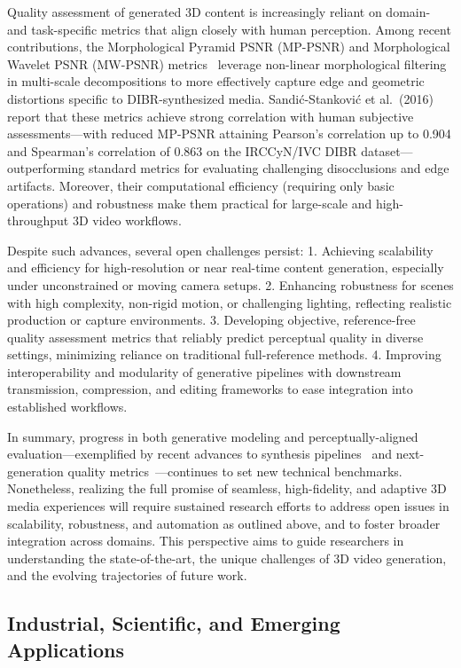 \documentclass[sigconf]{acmart}
\begin{document}
Quality assessment of generated 3D content is increasingly reliant on domain- and task-specific metrics that align closely with human perception. Among recent contributions, the Morphological Pyramid PSNR (MP-PSNR) and Morphological Wavelet PSNR (MW-PSNR) metrics~\cite{ref99} leverage non-linear morphological filtering in multi-scale decompositions to more effectively capture edge and geometric distortions specific to DIBR-synthesized media. Sandić-Stanković et al.~(2016)~\cite{ref99} report that these metrics achieve strong correlation with human subjective assessments---with reduced MP-PSNR attaining Pearson's correlation up to 0.904 and Spearman's correlation of 0.863 on the IRCCyN/IVC DIBR dataset---outperforming standard metrics for evaluating challenging disocclusions and edge artifacts. Moreover, their computational efficiency (requiring only basic operations) and robustness make them practical for large-scale and high-throughput 3D video workflows.

Despite such advances, several open challenges persist:
1. Achieving scalability and efficiency for high-resolution or near real-time content generation, especially under unconstrained or moving camera setups.
2. Enhancing robustness for scenes with high complexity, non-rigid motion, or challenging lighting, reflecting realistic production or capture environments.
3. Developing objective, reference-free quality assessment metrics that reliably predict perceptual quality in diverse settings, minimizing reliance on traditional full-reference methods.
4. Improving interoperability and modularity of generative pipelines with downstream transmission, compression, and editing frameworks to ease integration into established workflows.

In summary, progress in both generative modeling and perceptually-aligned evaluation---exemplified by recent advances to synthesis pipelines~\cite{ref98} and next-generation quality metrics~\cite{ref99}---continues to set new technical benchmarks. Nonetheless, realizing the full promise of seamless, high-fidelity, and adaptive 3D media experiences will require sustained research efforts to address open issues in scalability, robustness, and automation as outlined above, and to foster broader integration across domains. This perspective aims to guide researchers in understanding the state-of-the-art, the unique challenges of 3D video generation, and the evolving trajectories of future work.

\subsection{Industrial, Scientific, and Emerging Applications}
\end{document}
